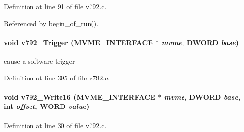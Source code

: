 Definition at line 91 of file v792.c.

Referenced by begin\_\-of\_\-run().
\paragraph[{v792\_\-Trigger}]{\setlength{\rightskip}{0pt plus 5cm}void v792\_\-Trigger ({\bf MVME\_\-INTERFACE} $\ast$ {\em mvme}, \/  {\bf DWORD} {\em base})}\hfill\label{v792_8c_a14c74a32db3fd4dacdeadfdfdefaff26}
cause a software trigger 

Definition at line 395 of file v792.c.
\paragraph[{v792\_\-Write16}]{\setlength{\rightskip}{0pt plus 5cm}void v792\_\-Write16 ({\bf MVME\_\-INTERFACE} $\ast$ {\em mvme}, \/  {\bf DWORD} {\em base}, \/  int {\em offset}, \/  {\bf WORD} {\em value})}\hfill\label{v792_8c_ab06f0b9d499f3b99ad9d9ad1cb879b29}


Definition at line 30 of file v792.c.